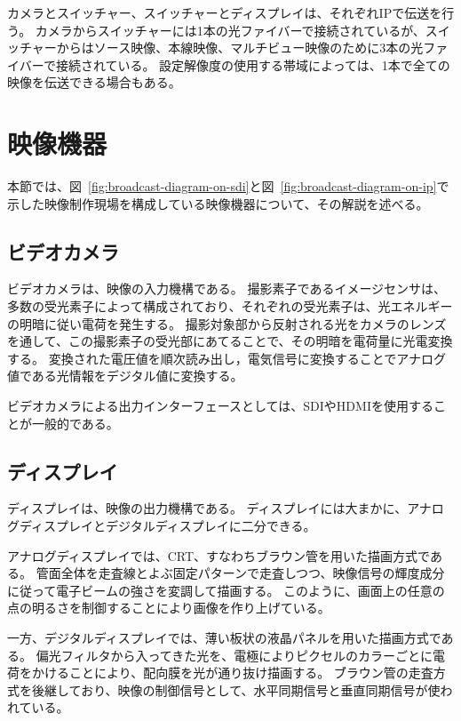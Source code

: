 カメラとスイッチャー、スイッチャーとディスプレイは、それぞれIPで伝送を行う。
カメラからスイッチャーには1本の光ファイバーで接続されているが、スイッチャーからはソース映像、本線映像、マルチビュー映像のために3本の光ファイバーで接続されている。
設定解像度の使用する帯域によっては、1本で全ての映像を伝送できる場合もある。

\section{映像機器}
本節では、図~\ref{fig:broadcast-diagram-on-sdi}と図~\ref{fig:broadcast-diagram-on-ip}で示した映像制作現場を構成している映像機器について、その解説を述べる。

\subsection{ビデオカメラ}
\label{sec:camera}

ビデオカメラは、映像の入力機構である。
撮影素子であるイメージセンサは、多数の受光素子によって構成されており、それぞれの受光素子は、光エネルギーの明暗に従い電荷を発生する。
撮影対象部から反射される光をカメラのレンズを通して、この撮影素子の受光部にあてることで、その明暗を電荷量に光電変換する。
変換された電圧値を順次読み出し，電気信号に変換することでアナログ値である光情報をデジタル値に変換する。

ビデオカメラによる出力インターフェースとしては、SDIやHDMIを使用することが一般的である。

\subsection{ディスプレイ}
\label{sec:display}

ディスプレイは、映像の出力機構である。
ディスプレイには大まかに、アナログディスプレイとデジタルディスプレイに二分できる。

アナログディスプレイでは、CRT、すなわちブラウン管を用いた描画方式である。
管面全体を走査線とよぶ固定パターンで走査しつつ、映像信号の輝度成分に従って電子ビームの強さを変調して描画する。
このように、画面上の任意の点の明るさを制御することにより画像を作り上げている。

一方、デジタルディスプレイでは、薄い板状の液晶パネルを用いた描画方式である。
偏光フィルタから入ってきた光を、電極によりピクセルのカラーごとに電荷をかけることにより、配向膜を光が通り抜け描画する。
ブ゙ラウン管の走査方式を後継しており、映像の制御信号として、水平同期信号と垂直同期信号が使われている。

